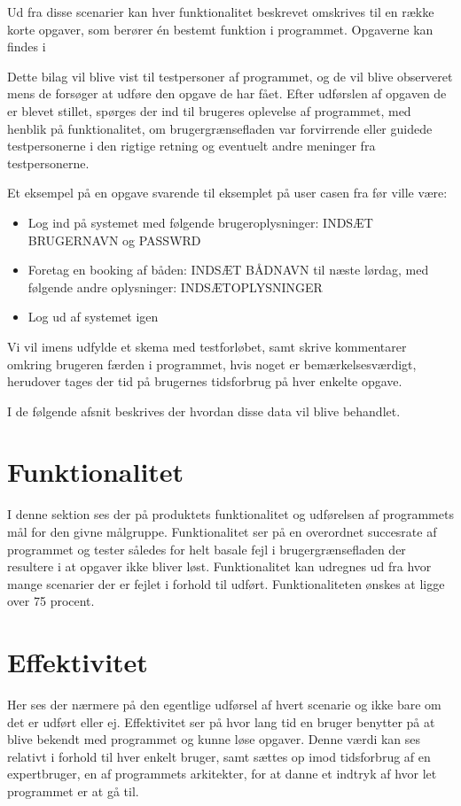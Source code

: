 Ud fra disse scenarier kan hver funktionalitet beskrevet omskrives til en række korte opgaver, som berører én bestemt funktion i programmet. Opgaverne kan findes i 

Dette bilag vil blive vist til testpersoner af programmet, og de vil blive observeret mens de forsøger at udføre den opgave de har fået. Efter udførslen af opgaven de er blevet stillet, spørges der ind til brugeres oplevelse af programmet, med henblik på funktionalitet, om brugergrænsefladen var forvirrende eller guidede testpersonerne i den rigtige retning og eventuelt andre meninger fra testpersonerne.

Et eksempel på en opgave svarende til eksemplet på user casen fra før ville være:

\begin{itemize}
\item Log ind på systemet med følgende brugeroplysninger: INDSÆT BRUGERNAVN og PASSWRD
\item Foretag en booking af båden: INDSÆT BÅDNAVN til næste lørdag, med følgende andre oplysninger: INDSÆTOPLYSNINGER
\item Log ud af systemet igen
\end{itemize}

Vi vil imens udfylde et skema med testforløbet, samt skrive kommentarer omkring brugeren færden i programmet, hvis noget er bemærkelsesværdigt, herudover tages der tid på brugernes tidsforbrug på hver enkelte opgave.

I de følgende afsnit beskrives der hvordan disse data vil blive behandlet.
\cbend
{}

\section{Funktionalitet}
I denne sektion ses der på produktets funktionalitet og udførelsen af programmets mål for den givne målgruppe. Funktionalitet ser på en overordnet succesrate af programmet og tester således for helt basale fejl i brugergrænsefladen der resultere i at opgaver ikke bliver løst. Funktionalitet kan udregnes ud fra hvor mange scenarier der er fejlet i forhold til udført. Funktionaliteten ønskes at ligge over 75 procent. 

\section{Effektivitet}
Her ses der nærmere på den egentlige udførsel af hvert scenarie og ikke bare om det er udført eller ej. Effektivitet ser på hvor lang tid en bruger benytter på at blive bekendt med programmet og kunne løse opgaver. Denne værdi kan ses relativt i forhold til hver enkelt bruger, samt sættes op imod tidsforbrug af en expertbruger, en af programmets arkitekter, for at danne et indtryk af hvor let programmet er at gå til.

